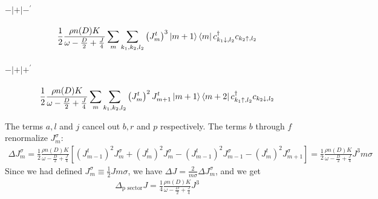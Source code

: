 \documentclass[12pt]{revtex4-2}
\begin{document}
\paragraph{\(-|+|-^\prime\)}
\begin{equation}\begin{aligned}
	\frac{1}{2}\frac{\rho n(D) K}{\omega - \frac{D}{2} + \frac{J}{4}}\sum_{m}\sum_{k_1,k_2,l_2} \left( J^t_{m} \right)^3\ket{m+1}\bra{m}c^\dagger_{k_1 \downarrow, l_2}c_{k_2 \uparrow,l_2}
\end{aligned}\end{equation}

\paragraph{\(-|+|+^\prime\)}
\begin{equation}\begin{aligned}
	\frac{1}{2}\frac{\rho n(D) K}{\omega - \frac{D}{2} + \frac{J}{4}}\sum_{m}\sum_{k_1,k_2,l_2} \left( J^t_{m} \right)^2 J^t_{m+1}\ket{m+1}\bra{m+2}c^\dagger_{k_1 \uparrow, l_2}c_{k_2 \downarrow,l_2}
\end{aligned}\end{equation}

The terms \(a,l\) and \(j\) cancel out \(b,r\) and \(p\) respectively. The terms \(b\) through \(f\) renormalize \(J^\sigma_m\):
\begin{equation}\begin{aligned}
	\Delta J^\sigma_m = \frac{1}{2}\frac{\rho n(D) K}{\omega - \frac{D}{2} + \frac{J}{4}}\left[\left( J^t_{m-1} \right)^2 J^\sigma_m + \left( J^t_m \right)^2 J^\sigma_m - \left( J^t_{m-1} \right)^2 J^\sigma_{m-1} - \left(J^t_m\right)^2 J^\sigma_{m+1} \right] = \frac{1}{2}\frac{\rho n(D) K}{\omega - \frac{D}{2} + \frac{J}{4}}J^3 m \sigma
\end{aligned}\end{equation}
Since we had defined \(J^\sigma_m \equiv \frac{1}{2}J m \sigma\), we have \(\Delta J = \frac{2}{m\sigma}\Delta J^\sigma_m\), and we get
\begin{equation}\begin{aligned}
	\Delta_\text{p sector} J = \frac{1}{4}\frac{\rho n(D) K}{\omega - \frac{D}{2} + \frac{J}{4}}J^3
\end{aligned}\end{equation}
\end{document}

